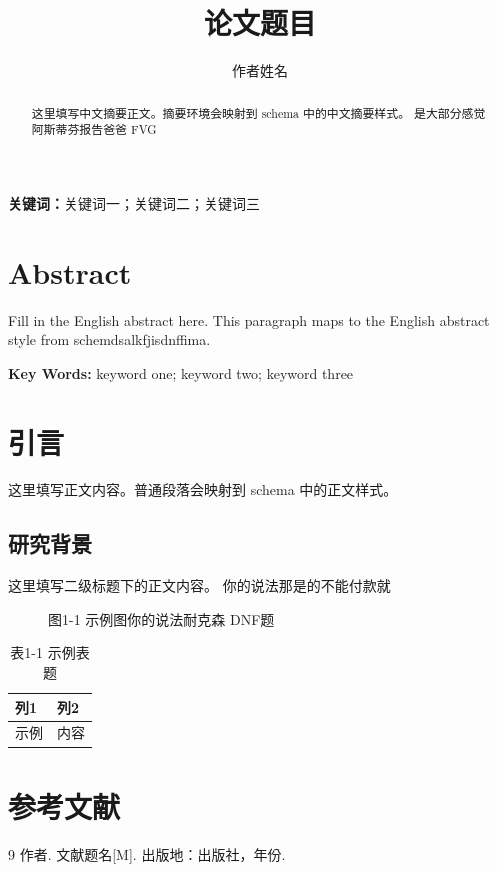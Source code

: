 \documentclass[12pt]{article}
\title{论文题目}
\author{作者姓名}
\date{}
\begin{document}
\maketitle
\begin{abstract}
这里填写中文摘要正文。摘要环境会映射到 schema 中的中文摘要样式。 是大部分感觉阿斯蒂芬报告爸爸 FVG
\end{abstract}
\textbf{关键词：}关键词一；关键词二；关键词三

\section*{Abstract}
Fill in the English abstract here. This paragraph maps to the English abstract style from schemdsalkfjisdnffima.

\textbf{Key Words:} keyword one; keyword two; keyword three

\section{引言}
这里填写正文内容。普通段落会映射到 schema 中的正文样式。

\subsection{研究背景}
这里填写二级标题下的正文内容。 你的说法那是的不能付款就

\begin{figure}[htbp]
\centering
\fbox{\rule{0pt}{2in}\rule{0.8\linewidth}{0pt}}
\caption{图1-1 示例图你的说法耐克森 DNF题}
\end{figure}

\begin{table}[htbp]
\centering
\caption{表1-1 示例表题}
\begin{tabular}{ll}
\toprule
列1 & 列2 \\
\midrule
示例 & 内容 \\
\bottomrule
\end{tabular}
\end{table}

\section*{参考文献}
\begin{thebibliography}{9}
 作者. 文献题名[M]. 出版地：出版社，年份.
\end{thebibliography}
\end{document}
